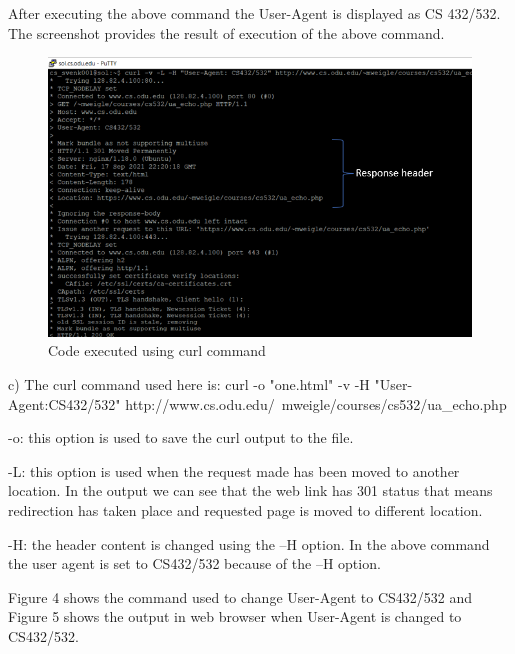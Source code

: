 \documentclass[12pt]{article}
\begin{document}
After executing the above command the User-Agent is displayed as CS 432/532. The screenshot provides the result of execution of the above command.
\begin{figure}[h]
    \centering
    \includegraphics[trim=0 0 0 0, clip, width=\textwidth] {thre.PNG}
    \caption{Code executed using curl command}
    \label{fig:web-growth}
\end{figure}
\newline
\newline
\newline
c) The curl command used here is:\newline
curl -o "one.html" -v -H "User-Agent:CS432/532" http://www.cs.odu.edu/~mweigle/courses/cs532/ua_echo.php 

-o: this option is used to save the curl output to the file.

-L: this option is used when the request made has been moved to another location. In the output we can see that the web link has 301 status that means redirection has taken place and requested page is moved to different location.

-H: the header content is changed using the –H option. In the above command the user agent is set to CS432/532 because of the –H option.

Figure 4 shows the command used to change User-Agent to CS432/532 and Figure 5 shows the output in web browser when User-Agent is changed to CS432/532.
\end{document}
